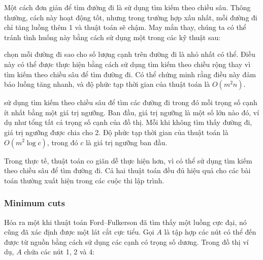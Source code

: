 Một cách đơn giản để tìm đường đi là sử dụng tìm kiếm theo chiều sâu.
Thông thường, cách này hoạt động tốt, nhưng trong trường hợp xấu nhất,
mỗi đường đi chỉ tăng luồng thêm 1
và thuật toán sẽ chậm.
May mắn thay, chúng ta có thể tránh tình huống này
bằng cách sử dụng một trong các kỹ thuật sau:


 \cite{edm72}
chọn mỗi đường đi sao cho số lượng cạnh
trên đường đi là nhỏ nhất có thể.
Điều này có thể được thực hiện bằng cách sử dụng tìm kiếm theo chiều rộng
thay vì tìm kiếm theo chiều sâu để tìm đường đi.
Có thể chứng minh rằng điều này đảm bảo
luồng tăng nhanh, và độ phức tạp thời gian
của thuật toán là $O(m^2 n)$.


 \cite{ahu91} sử dụng tìm kiếm theo chiều sâu
để tìm các đường đi trong đó mỗi trọng số cạnh
ít nhất bằng một giá trị ngưỡng.
Ban đầu, giá trị ngưỡng là
một số lớn nào đó, ví dụ như tổng tất cả
trọng số cạnh của đồ thị.
Mỗi khi không tìm thấy đường đi,
giá trị ngưỡng được chia cho 2.
Độ phức tạp thời gian của thuật toán là $O(m^2 \log c)$,
trong đó $c$ là giá trị ngưỡng ban đầu.

Trong thực tế, thuật toán co giãn dễ thực hiện hơn,
vì có thể sử dụng tìm kiếm theo chiều sâu để tìm đường đi.
Cả hai thuật toán đều đủ hiệu quả cho các bài toán
thường xuất hiện trong các cuộc thi lập trình.

\subsubsection{Minimum cuts}


Hóa ra một khi thuật toán Ford–Fulkerson
đã tìm thấy một luồng cực đại,
nó cũng đã xác định được một lát cắt cực tiểu.
Gọi $A$ là tập hợp các nút
có thể đến được từ nguồn
bằng cách sử dụng các cạnh có trọng số dương.
Trong đồ thị ví dụ, $A$ chứa các nút 1, 2 và 4:

